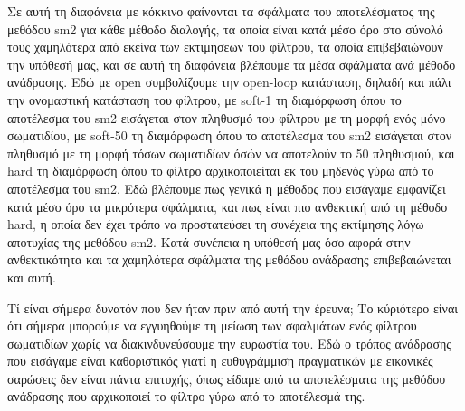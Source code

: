 \documentclass[a4paper,10pt]{article}
\begin{document}
Σε αυτή τη διαφάνεια με κόκκινο φαίνονται τα σφάλματα του αποτελέσματος της
μεθόδου sm2 για κάθε μέθοδο διαλογής, τα οποία είναι κατά μέσο όρο στο σύνολό
τους χαμηλότερα από εκείνα των εκτιμήσεων του φίλτρου, τα οποία επιβεβαιώνουν
την υπόθεσή μας, και σε αυτή τη διαφάνεια βλέπουμε τα μέσα σφάλματα ανά μέθοδο
ανάδρασης. Εδώ με open συμβολίζουμε την open-loop κατάσταση, δηλαδή και πάλι
την ονομαστική κατάσταση του φίλτρου, με soft-1 τη διαμόρφωση όπου το
αποτέλεσμα του sm2 εισάγεται στον πληθυσμό του φίλτρου με τη μορφή ενός μόνο
σωματιδίου, με soft-50 τη διαμόρφωση όπου το αποτέλεσμα του sm2 εισάγεται στον
πληθυσμό με τη μορφή τόσων σωματιδίων όσών να αποτελούν το 50%
πληθυσμού, και hard τη διαμόρφωση όπου το φίλτρο αρχικοποιείται εκ του μηδενός
γύρω από το αποτέλεσμα του sm2. Εδώ βλέπουμε πως γενικά η μέθοδος που εισάγαμε
εμφανίζει κατά μέσο όρο τα μικρότερα σφάλματα, και πως είναι πιο ανθεκτική από
τη μέθοδο hard, η οποία δεν έχει τρόπο να προστατεύσει τη συνέχεια της
εκτίμησης λόγω αποτυχίας της μεθόδου sm2.  Κατά συνέπεια η υπόθεσή μας όσο
αφορά στην ανθεκτικότητα και τα χαμηλότερα σφάλματα της μεθόδου ανάδρασης
επιβεβαιώνεται και αυτή.

Τί είναι σήμερα δυνατόν που δεν ήταν πριν από αυτή την έρευνα; Το κύριότερο
είναι ότι σήμερα μπορούμε να εγγυηθούμε τη μείωση των σφαλμάτων ενός φίλτρου
σωματιδίων χωρίς να διακινδυνεύσουμε την ευρωστία του. Εδώ ο τρόπος ανάδρασης
που εισάγαμε είναι καθοριστικός γιατί η ευθυγράμμιση πραγματικών με εικονικές
σαρώσεις δεν είναι πάντα επιτυχής, όπως είδαμε από τα αποτελέσματα της μεθόδου
ανάδρασης που αρχικοποιεί το φίλτρο γύρω από το αποτέλεσμά της.
\end{document}
